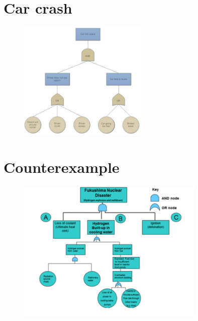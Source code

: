 \documentclass[aspectratio=1610,pdftex,dvipsnames,compress,xcolor={dvipsnames}]{beamer}
\begin{document}
\section{Car crash}


\addtocounter{framenumber}{-1}
\begin{frame}{}
    \begin{figure}
        \centering
        \includegraphics[width=0.55\textwidth]{fault.tree_car.jpg}
    \end{figure}
\end{frame}


\section{Counterexample}


\addtocounter{framenumber}{-1}
\begin{frame}{}
    \begin{figure}
        \centering
        \includegraphics[width=0.80\textwidth]{fault.tree_fukushima.jpg}
    \end{figure}
\end{frame}
\end{document}
